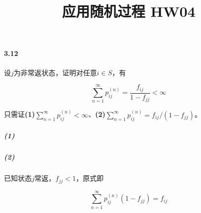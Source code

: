 \documentclass{../notes}
\title{应用随机过程 HW04}
\begin{document}
    \maketitle

    \paragraph*{3.12} 设$j$为非常返状态，证明对任意$i\in S$，有

    \begin{equation*}
        \sum_{n=1}^\infty p_{ij}^{(n)} = \frac{f_{ij}}{1-f_{jj}} < \infty
    \end{equation*}

    只需证\textbf{(1)}$\sum_{n=1}^\infty p_{ij}^{(n)} < \infty$、\textbf{(2)}$\sum_{n=1}^\infty p_{ij}^{(n)} = f_{ij}/\left(1-f_{jj}\right)$。

    \subparagraph*{(1)} 
    \subparagraph*{(2)} 已知状态$j$常返，$f_{jj} < 1$，原式即

    \begin{equation*}
        \sum_{n=1}^\infty p_{ij}^{(n)}(1-f_{jj}) = f_{ij}
    \end{equation*}
\end{document}

